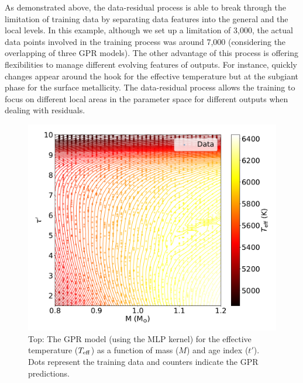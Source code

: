 As demonstrated above, the data-residual process is able to break through the limitation of training data by separating data features into the general and the local levels. In this example, although we set up a limitation of 3,000, the actual data points involved in the training process was around 7,000 (considering the overlapping of three GPR models). The other advantage of this process is offering flexibilities to manage different evolving features of outputs. For instance, quickly changes appear around the hook for the effective temperature but at the subgiant phase for the surface metallicity. The data-residual process allows the training to focus on different local areas in the parameter space for different outputs when dealing with residuals.   

\begin{figure}
	\includegraphics[width=1.0\columnwidth]{2d_gpmodel_MLP.pdf}
    \caption{Top: The GPR model (using the MLP kernel) for the effective temperature ($T_{\rm eff}$) as a function of mass ($M$) and age index ($t'$). Dots represent the training data and counters indicate the GPR predictions. }  
    \label{fig:gpmodel}
\end{figure}


